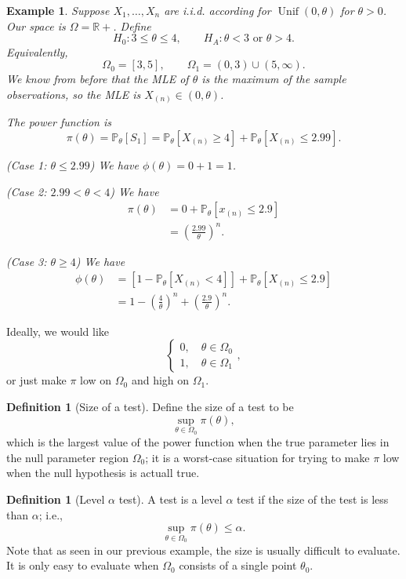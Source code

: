 \documentclass{tufte-handout}
\newcommand*\R{\mathbb{R}}
\renewcommand{\P}{\mathbb{P}}
\newtheorem{ex}[thm]{Example}
\theoremstyle{definition}
\newtheorem{defn}[thm]{Definition}
\begin{document}
\begin{ex}
	Suppose $X_1,\ldots,X_n$ are i.i.d. according for $\operatorname{Unif}(0,\theta)$ for $\theta>0$. Our space is $\Omega = \R+$. Define \[
		H_0 : 3 \le \theta \le 4, \qquad
		H_A: \theta < 3 \text{ or } \theta > 4
		.\] Equivalently, \[
		\Omega_0 = [3,5], \qquad \Omega_1 = (0,3) \cup (5,\infty)
	.\] We know from before that the MLE of $\theta$ is the maximum of the sample observations, so the MLE is $X_{(n)} \in (0,\theta)$.

	The power function is \[
		\pi(\theta) = \P_\theta\left[ S_1 \right] = \P_\theta\left[ X_{(n)} \ge 4 \right] + \P_\theta\left[ X_{(n)} \le 2.99 \right] 
	.\]

	(Case 1: $\theta \le 2.99$) We have $\phi(\theta) = 0 + 1 = 1$.

	(Case 2: $2.99 < \theta < 4$) We have 
	\begin{align*}
		\pi(\theta) &= 0 + \P_\theta\left[ x_{(n)} \le 2.9 \right]  \\
					&= \left( \frac{2.99}{\theta} \right)^{n}
	.\end{align*}

	(Case 3: $\theta \ge 4$) We have
	\begin{align*}
		\phi(\theta) &= \left[ 1-\P_\theta \left[ X_{(n)} < 4 \right]  \right] + \P_\theta\left[ X_{(n)} \le 2.9 \right] \\
					 &=1 - (\frac{4}{\theta})^{n} + \left( \frac{2.9}{\theta} \right)^{n}
	.\end{align*}
\end{ex}

Ideally, we would like \[ \begin{cases}
		0, \quad \theta \in \Omega_0 \\
		1, \quad \theta \in \Omega_1
	\end{cases}
,\] or just make $\pi$ low on $\Omega_0$ and high on $\Omega_1$.

\begin{defn}[Size of a test]
	Define the size of a test to be \[
		\sup\limits_{\theta \in \Omega_0} \pi(\theta)
	,\] which is the largest value of the power function when the true parameter lies in the null parameter region $\Omega_0$; it is a worst-case situation for trying to make $\pi$ low when the null hypothesis is actuall true.
\end{defn}

\begin{defn}[Level $\alpha$ test]
	A test is a level $\alpha$ test if the size of the test is less than $\alpha$; i.e., \[
		\sup_{\theta \in \Omega_0} \pi(\theta) \le \alpha
	.\] Note that as seen in our previous example, the size is usually difficult to evaluate. It is only easy to evaluate when $\Omega_0$ consists of a single point $\theta_0$.
\end{defn}
\end{document}
